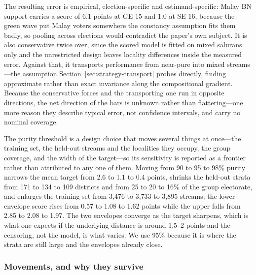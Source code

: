\documentclass[11pt]{article}
\begin{document}
The resulting error is empirical, election-specific and estimand-specific: Malay BN support carries a score of 6.1 points at GE-15 and 1.0 at SE-16, because the green wave put Malay voters somewhere the constancy assumption fits them badly, so pooling across elections would contradict the paper's own subject. It is also conservative twice over, since the scored model is fitted on mixed salurans only and the unrestricted design leaves locality differences inside the measured error. Against that, it transports performance from near-pure into mixed streams---the assumption Section~\ref{sec:strategy-transport} probes directly, finding approximate rather than exact invariance along the compositional gradient. Because the conservative forces and the transporting one run in opposite directions, the net direction of the bars is unknown rather than flattering---one more reason they describe typical error, not confidence intervals, and carry no nominal coverage.

The purity threshold is a design choice that moves several things at once---the training set, the held-out streams and the localities they occupy, the group coverage, and the width of the target---so its sensitivity is reported as a frontier rather than attributed to any one of them. Moving from 90 to 95 to 98\% purity narrows the mean target from 2.6 to 1.1 to 0.4 points, shrinks the held-out strata from 171 to 134 to 109 districts and from 25 to 20 to 16\% of the group electorate, and enlarges the training set from 3,476 to 3,733 to 3,895 streams; the lower-envelope score rises from 0.57 to 1.08 to 1.62 points while the upper falls from 2.85 to 2.08 to 1.97. The two envelopes converge as the target sharpens, which is what one expects if the underlying distance is around 1.5--2 points and the censoring, not the model, is what varies. We use 95\% because it is where the strata are still large and the envelopes already close.

\subsubsection*{Movements, and why they survive}
\end{document}
